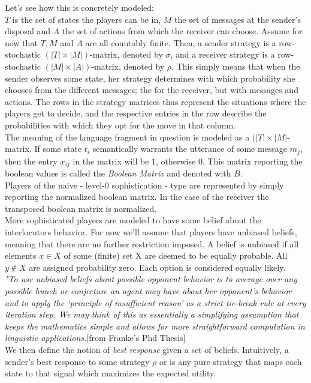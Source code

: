 \documentclass{article}
\begin{document}
Let's see how this is concretely modeled:\\
$T$ is the set of states the players can be in, $M$ the set of messages at the sender's disposal and $A$ the set of actions from which the receiver can choose. Assume for now that $T,M$ and $A$ are all countably finite. Then,  a sender strategy is a row-stochastic $(|T| \times |M|)$-matrix, denoted by $\sigma$, and a receiver strategy is a row-stochastic $(|M|\times |A|)$-matrix, denoted by $\rho$. This simply means that when the sender observes some state, her strategy determines with which probability she chooses from the different messages; the for the receiver, but with messages and actions. The rows in the strategy matrices thus represent the situations where the players get to decide, and the respective entries in the row describe the probabilities with which they opt for the move in that column.\\
The meaning of the language fragment in question is modeled as a $(|T| \times |M|$-matrix. If some state $t_i$ semantically warrants the utterance of some message $m_j$, then the entry $x_{ij}$ in the matrix will be $1$, otherwise $0$. This matrix reporting the boolean values is called the \textit{Boolean Matrix}  and denoted with $B$.\\
Players of the naive - level-0 sophistication - type are represented by simply reporting the normalized boolean matrix. In the case of the receiver the transposed boolean matrix is normalized.\\
More sophisticated players are modeled to have some belief about the interlocutors behavior. For now we'll assume that players have unbiased beliefs, meaning that there are no further restriction imposed. A belief is unbiased if all elements $x\in X$ of some (finite) set X are deemed to be equally probable. All $y\not\in X$ are assigned probability zero. Each option is considered equally likely.\\
 \textit{"To use unbiased beliefs about possible opponent behavior is to average over any possible hunch or conjecture an agent may have about her opponent’s behavior and to apply the ‘principle of insufficient reason’ as a strict tie-break rule at every iteration step. We may think of this as essentially a simplifying assumption that keeps the mathematics simple and allows for more straightforward computation in linguistic applications.}[from Franke's Phd Thesis]\\
We then define the notion of \textit{best response} given a set of beliefs. Intuitively, a sender's best response to some strategy $\rho$ or is any pure strategy that maps each state to that signal which maximizes the expected utility.
\end{document}
